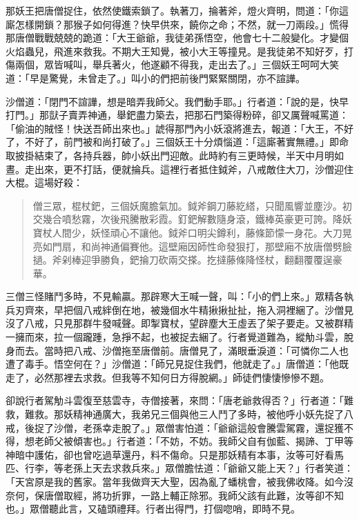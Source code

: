 那妖王把唐僧捉住，依然使鐵索鎖了。執著刀，掄著斧，燈火齊明，問道：「你這廝怎樣開鎖？那猴子如何得進？快早供來，饒你之命；不然，就一刀兩段。」慌得那唐僧戰戰兢兢的跪道：「大王爺爺，我徒弟孫悟空，他會七十二般變化。才變個火焰蟲兒，飛進來救我。不期大王知覺，被小大王等撞見。是我徒弟不知好歹，打傷兩個，眾皆喊叫，舉兵著火，他遂顧不得我，走出去了。」三個妖王呵呵大笑道：「早是驚覺，未曾走了。」叫小的們把前後門緊緊關閉，亦不諠譁。

沙僧道：「閉門不諠譁，想是暗弄我師父。我們動手耶。」行者道：「說的是，快早打門。」那獃子賣弄神通，舉鈀盡力築去，把那石門築得粉碎，卻又厲聲喊罵道：「偷油的賊怪！快送吾師出來也。」諕得那門內小妖滾將進去，報道：「大王，不好了，不好了，前門被和尚打破了。」三個妖王十分煩惱道：「這廝著實無禮。」即命取披掛結束了，各持兵器，帥小妖出門迎敵。此時約有三更時候，半天中月明如晝。走出來，更不打話，便就掄兵。這裡行者抵住鉞斧，八戒敵住大刀，沙僧迎住大棍。這場好殺：
\begin{quote}
僧三眾，棍杖鈀，三個妖魔膽氣加。鉞斧鋼刀藤紇䌋，只聞風響並塵沙。初交幾合噴愁霧，次後飛騰散彩霞。釘鈀解數隨身滾，鐵棒英豪更可誇。降妖寶杖人間少，妖怪頑心不讓他。鉞斧口明尖鐏利，藤條節懞一身花。大刀晃亮如門扇，和尚神通偏賽他。這壁廂因師性命發狠打，那壁廂不放唐僧劈臉撾。斧剁棒迎爭勝負，鈀掄刀砍兩交搽。扢撻藤條降怪杖，翻翻覆覆逞豪華。
\end{quote}

三僧三怪賭鬥多時，不見輸贏。那辟寒大王喊一聲，叫：「小的們上來。」眾精各執兵刃齊來，早把個八戒絆倒在地，被幾個水牛精揪揪扯扯，拖入洞裡綑了。沙僧見沒了八戒，只見那群牛發喊聲。即掣寶杖，望辟塵大王虛丟了架子要走。又被群精一擁而來，拉一個躘踵，急掙不起，也被捉去綑了。行者覺道難為，縱觔斗雲，脫身而去。當時把八戒、沙僧拖至唐僧前。唐僧見了，滿眼垂淚道：「可憐你二人也遭了毒手。悟空何在？」沙僧道：「師兄見捉住我們，他就走了。」唐僧道：「他既走了，必然那裡去求救。但我等不知何日方得脫網。」師徒們悽悽慘慘不題。

卻說行者駕觔斗雲復至慈雲寺，寺僧接著，來問：「唐老爺救得否？」行者道：「難救，難救。那妖精神通廣大，我弟兄三個與他三人鬥了多時，被他呼小妖先捉了八戒，後捉了沙僧，老孫幸走脫了。」眾僧害怕道：「爺爺這般會騰雲駕霧，還捉獲不得，想老師父被傾害也。」行者道：「不妨，不妨。我師父自有伽藍、揭諦、丁甲等神暗中護佑，卻也曾吃過草還丹，料不傷命。只是那妖精有本事，汝等可好看馬匹、行李，等老孫上天去求救兵來。」眾僧膽怯道：「爺爺又能上天？」行者笑道：「天宮原是我的舊家。當年我做齊天大聖，因為亂了蟠桃會，被我佛收降。如今沒奈何，保唐僧取經，將功折罪，一路上輔正除邪。我師父該有此難，汝等卻不知也。」眾僧聽此言，又磕頭禮拜。行者出得門，打個唿哨，即時不見。

